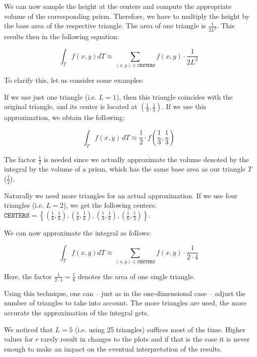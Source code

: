\documentclass{article}
\begin{document}
We can now sample the height at the centers and compute the appropriate volume of the corresponding prism. Therefore, we have to multiply the height by the base area of the respective triangle. The area of one triangle is $\frac{1}{2 L^2}$. This results then in the following equation:

\begin{equation}
  \int_T f(x,y) dT \approx \sum_{(x,y)\in\mathtt{CENTERS}} f(x,y) \cdot \frac{1}{2L^2}
\end{equation}

To clarify this, let us consider some examples:

If we use just one triangle (i.e. $L=1$), then this triangle coincides with the original triangle, and its center is located at $(\frac{1}{3}, \frac{1}{3})$. If we use this approximation, we obtain the following:

\begin{equation*}
  \int_T f(x,y)\, dT \approx \frac{1}{2} \cdot f(\frac{1}{3},\frac{1}{3})
\end{equation*}

The factor $\frac{1}{2}$ is needed since we actually approximate the volume denoted by the integral by the volume of a prism, which has the same base area as our triangle $T$ ($\frac{1}{2}$).

Naturally we need more triangles for an actual approximation. If we use four triangles (i.e. $L=2$), we get the following centers: $\mathtt{CENTERS} = \left\{ (\frac{1}{6}, \frac{1}{6}), (\frac{1}{6}, \frac{1}{6}), (\frac{1}{3}, \frac{1}{6}), (\frac{1}{6},\frac{1}{3}) \right\}$.

We can now approximate the integral as follows:

\begin{equation*}
  \int_T f(x,y) dT \approx \sum_{(x,y)\in\mathtt{CENTERS}} f(x,y)\cdot \frac{1}{2\cdot 4}
\end{equation*}

Here, the factor $\frac{1}{2\cdot 4}= \frac{1}{8}$ denotes the area of one single triangle.

Using this technique, one can -- just as in the one-dimensional case -- adjust the number of triangles to take into account. The more triangles are used, the more accurate the approximation of the integral gets.

We noticed that $L=5$ (i.e. using 25 triangles) suffices most of the time. Higher values for $r$ rarely result in changes to the plots and if that is the case it is never enough to make an impact on the eventual interpretation of the results.
\end{document}
